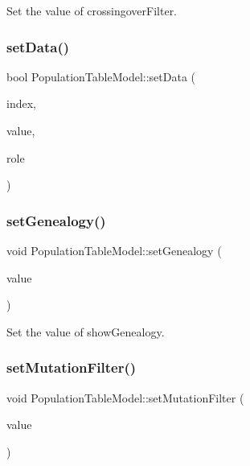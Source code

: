Set the value of crossingover\+Filter. 

\mbox{\label{class_population_table_model_a6cf9eae4078f090d7fbd0883bc0eaf06}} 
\subsubsection{\texorpdfstring{set\+Data()}{setData()}}
{\footnotesize\ttfamily bool Population\+Table\+Model\+::set\+Data (\begin{DoxyParamCaption}\item[{const Q\+Model\+Index \&}]{index,  }\item[{const Q\+Variant \&}]{value,  }\item[{int}]{role }\end{DoxyParamCaption})}

\mbox{\label{class_population_table_model_a04993b940f7f6950491caf84835c3318}} 
\subsubsection{\texorpdfstring{set\+Genealogy()}{setGenealogy()}}
{\footnotesize\ttfamily void Population\+Table\+Model\+::set\+Genealogy (\begin{DoxyParamCaption}\item[{bool}]{value }\end{DoxyParamCaption})}



Set the value of show\+Genealogy. 

\mbox{\label{class_population_table_model_a626b38549b3b6584101d12a33e6ca0b7}} 
\subsubsection{\texorpdfstring{set\+Mutation\+Filter()}{setMutationFilter()}}
{\footnotesize\ttfamily void Population\+Table\+Model\+::set\+Mutation\+Filter (\begin{DoxyParamCaption}\item[{bool}]{value }\end{DoxyParamCaption})}



